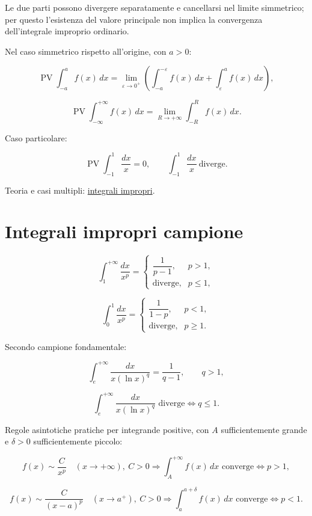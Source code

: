 Le due parti possono divergere separatamente e cancellarsi nel limite simmetrico; per questo l'esistenza del valore principale non implica la convergenza dell'integrale improprio ordinario.

Nel caso simmetrico rispetto all'origine, con \(a>0\):

\[
\displaystyle
\operatorname{PV}\int_{-a}^{a}f(x)\,dx
=
\lim_{\varepsilon\to0^+}
\left(
\int_{-a}^{-\varepsilon}f(x)\,dx
+
\int_{\varepsilon}^{a}f(x)\,dx
\right),
\]

\[
\displaystyle
\operatorname{PV}\int_{-\infty}^{+\infty}f(x)\,dx
=
\lim_{R\to+\infty}\int_{-R}^{R}f(x)\,dx.
\]

Caso particolare:

\[
\displaystyle
\operatorname{PV}\int_{-1}^{1}\frac{dx}{x}=0,
\qquad
\int_{-1}^{1}\frac{dx}{x}\ \text{diverge}.
\]

Teoria e casi multipli: \href{https://ingegnerismo.it/matematica/integrali-impropri/}{integrali impropri}.

\section{Integrali impropri campione}\label{integrali-impropri-campione}

\[
\displaystyle
\int_1^{+\infty}\frac{dx}{x^p}
=
\begin{cases}
\dfrac1{p-1}, & p>1,\\[4pt]
\text{diverge}, & p\le1,
\end{cases}
\]

\[
\displaystyle
\int_0^1\frac{dx}{x^p}
=
\begin{cases}
\dfrac1{1-p}, & p<1,\\[4pt]
\text{diverge}, & p\ge1.
\end{cases}
\]

Secondo campione fondamentale:

\[
\int_e^{+\infty}\frac{dx}{x(\ln x)^q}
=
\frac1{q-1},
\qquad q>1,
\]

\[
\int_e^{+\infty}\frac{dx}{x(\ln x)^q}\text{ diverge}
\Longleftrightarrow q\le1.
\]

Regole asintotiche pratiche per integrande positive, con \(A\) sufficientemente grande e \(\delta>0\) sufficientemente piccolo:

\[
f(x)\sim\frac{C}{x^p}\quad(x\to+\infty),\ C>0
\Longrightarrow
\int_A^{+\infty} f(x)\,dx\text{ converge}\Longleftrightarrow p>1,
\]

\[
f(x)\sim\frac{C}{(x-a)^p}\quad(x\to a^+),\ C>0
\Longrightarrow
\int_a^{a+\delta} f(x)\,dx\text{ converge}\Longleftrightarrow p<1.
\]

